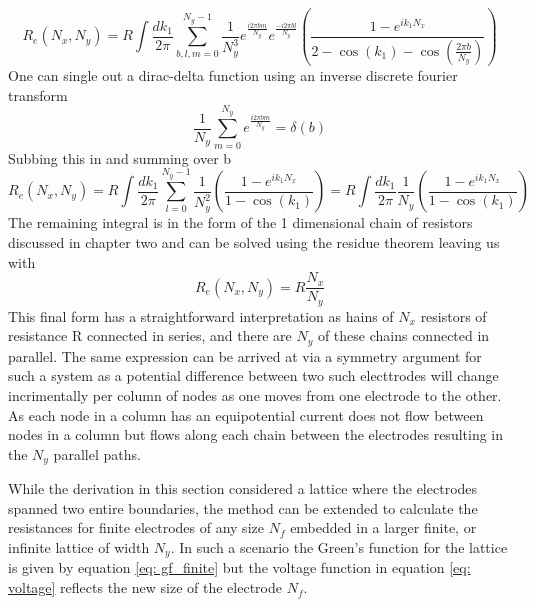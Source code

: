 \begin{equation}
R_e(N_x,N_y) = R \int \frac{dk_1}{2 \pi} \sum_{b,l,m=0}^{N_y-1} \frac{1}{N_y^3}e^{\frac{i 2\pi b m}{N_y}}e^{\frac{-i 2\pi b l}{N_y}} \left(\frac{1 - e^{i k_1 N_x}}{2 - \cos(k_1) - \cos(\frac{2 \pi b}{N_y})} \right)
\end{equation}
One can single out a dirac-delta function using an inverse discrete  fourier transform
\begin{equation}
\frac{1}{N_y} \sum_{m=0}^{N_y} e^{\frac{i 2 \pi b m}{N_y}} = \delta(b)
\end{equation}
Subbing this in and summing over b
\begin{equation}
R_e(N_x,N_y) = R \int \frac{dk_1}{2 \pi} \sum_{l=0}^{N_y-1} \frac{1}{N_y^2} \left(\frac{1 - e^{i k_1 N_x}}{1 - \cos(k_1) } \right) = R \int \frac{dk_1}{2 \pi} \frac{1}{N_y} \left(\frac{1 - e^{i k_1 N_x}}{1 - \cos(k_1) } \right)
\end{equation}
The remaining integral is in the form of the 1 dimensional chain of resistors discussed in chapter two and can be solved using the residue theorem leaving us with
\begin{equation}
R_e(N_x,N_y) = R \frac{N_x}{N_y}
\label{finite_eqn}
\end{equation}
This final form has a straightforward interpretation as hains of $N_x$ resistors of resistance R connected in series, and there are $N_y$ of these chains connected in parallel. The same expression can be arrived at via a symmetry argument for such a system as a potential difference between two such electtrodes will change incrimentally per column of nodes as one moves from one electrode to the other. As each node in a column has an equipotential current does not flow between nodes in a column but flows along each chain between the electrodes resulting in the $N_y$ parallel paths.

While the derivation in this section considered a lattice where the electrodes spanned two entire boundaries, the method can be extended to calculate the resistances for finite electrodes of any size $N_f$ embedded in a larger finite, or infinite lattice of width $N_y$. In such a scenario the Green's function for the lattice is given by equation \ref{eq: gf_finite} but the voltage function in equation \ref{eq: voltage} reflects the new size of the electrode $N_f$.
\begin{comment}
\begin{equation}
V(\vec{r}) = R \sum_{\textit{m}=0}^{N_f-1}\left(G(\vec{r}-\textit{m}\vec{a}_2)\frac{I}{N_f} - \sum_{\textit{n}=0}^{N_f-1}G(\vec{r} - N_x\vec{a}_1 - \textit{n}\vec{a}_2) i_{\textit{mn}}  \right)
\label{eq: finite_voltage}
\end{equation}
where $\sum_{\textit{n}=0}^{N_f-1} i_\text{mn} = \frac{I}{N_f}$. This alters the resitance equation to
\begin{equation}
R_{e}(N_x) = \frac{1}{N_f I}\left(\sum_{\textit{b}=0}^{N_f-1}V(0,\textit{b}) - \sum_{\textit{b}=0}^{N_f-1}V(N_x,\textit{b})\right)
\end{equation}
\end{comment}
